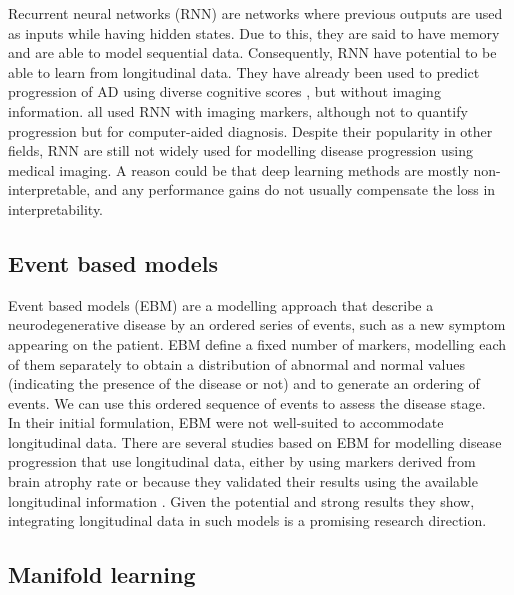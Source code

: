 Recurrent neural networks (RNN) are networks where previous outputs are used as inputs while having hidden states. Due to this, they are said to have memory and are able to model sequential data. Consequently, RNN have potential to be able to learn from longitudinal data. They have already been used to predict progression of AD using diverse cognitive scores \cite{Wang2018}, but without imaging information. \cite{Ghazi2019,Cui2018,Aghili2018} all used RNN with imaging markers, although not to quantify progression but for computer-aided diagnosis. Despite their popularity in other fields, RNN are still not widely used for modelling disease progression using medical imaging. A reason could be that deep learning methods are mostly non-interpretable, and any performance gains do not usually compensate the loss in interpretability. \\ 

\subsection{Event based models}

Event based models (EBM) \cite{Fonteijn2012} are a modelling approach that describe a neurodegenerative disease by an ordered series of events, such as a new symptom appearing on the patient. EBM define a fixed number of markers, modelling each of them separately to obtain a distribution of abnormal and normal values (indicating the presence of the disease or not) and to generate an ordering of events. We can use this ordered sequence of events to assess the disease stage. \\

In their initial formulation, EBM were not well-suited to accommodate longitudinal data. There are several studies based on EBM for modelling disease progression that use longitudinal data, either by using markers derived from brain atrophy rate \cite{Fonteijn2012,Huang2012,Young2014} or because they validated their results using the available longitudinal information \cite{Oxtoby2018,Young2014}. Given the potential and strong results they show, integrating longitudinal data in such models is a promising research direction. \\

\subsection{Manifold learning}

